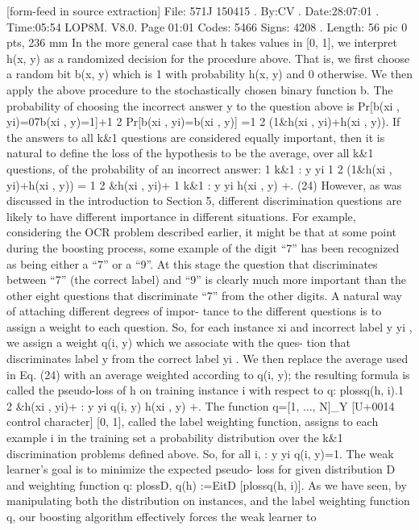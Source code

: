\documentclass[10pt]{article}
\begin{document}
\begin{ReviewVerbatim}
{[form-feed in source extraction]
File: 571J 150415 . By:CV . Date:28:07:01 . Time:05:54 LOP8M. V8.0. Page 01:01
Codes: 5466 Signs: 4208 . Length: 56 pic 0 pts, 236 mm
In the more general case that h takes values in [0, 1], we
interpret h(x, y) as a randomized decision for the procedure
above. That is, we first choose a random bit b(x, y) which
is 1 with probability h(x, y) and 0 otherwise. We then apply
the above procedure to the stochastically chosen binary
function b. The probability of choosing the incorrect answer
y to the question above is
Pr[b(xi , yi)=07b(xi , y)=1]+1
2 Pr[b(xi , yi)=b(xi , y)]
=1
2 (1&h(xi , yi)+h(xi , y)).
If the answers to all k&1 questions are considered
equally important, then it is natural to define the loss of the
hypothesis to be the average, over all k&1 questions, of the
probability of an incorrect answer:
1
k&1
:
y{ yi
1
2
(1&h(xi , yi)+h(xi , y))
=
1
2 \1&h(xi , yi)+
1
k&1
:
y{ yi
h(xi , y)
+. (24)
However, as was discussed in the introduction to Section 5,
different discrimination questions are likely to have different
importance in different situations. For example, considering
the OCR problem described earlier, it might be that at some
point during the boosting process, some example of the digit
``7'' has been recognized as being either a ``7'' or a ``9''. At this
stage the question that discriminates between ``7'' (the
correct label) and ``9'' is clearly much more important than
the other eight questions that discriminate ``7'' from the
other digits.
A natural way of attaching different degrees of impor-
tance to the different questions is to assign a weight to each
question. So, for each instance xi and incorrect label y{ yi ,
we assign a weight q(i, y) which we associate with the ques-
tion that discriminates label y from the correct label yi . We
then replace the average used in Eq. (24) with an average
weighted according to q(i, y); the resulting formula is called
the pseudo-loss of h on training instance i with respect to q:
plossq(h, i).1
2
\1&h(xi , yi)+ :
y{ yi
q(i, y) h(xi , y)
+.
The function q=[1, ..., N]_Y [U+0014 control character] [0, 1], called the label
weighting function, assigns to each example i in the training
set a probability distribution over the k&1 discrimination
problems defined above. So, for all i,
:
y{ yi
q(i, y)=1.
The weak learner's goal is to minimize the expected pseudo-
loss for given distribution D and weighting function q:
plossD, q(h) :=EitD [plossq(h, i)].
As we have seen, by manipulating both the distribution
on instances, and the label weighting function q, our
boosting algorithm effectively forces the weak learner to
}}}}}}
\end{ReviewVerbatim}
\end{document}
